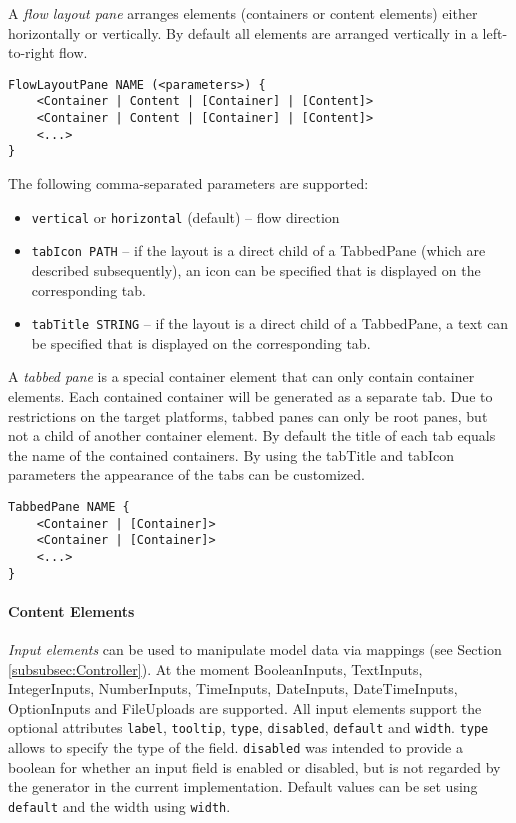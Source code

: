 A \textit{flow layout pane} arranges elements (containers or content elements) either horizontally or vertically. By default all elements are arranged vertically in a left-to-right flow.
\begin{lstlisting}
FlowLayoutPane NAME (<parameters>) {
	<Container | Content | [Container] | [Content]>
	<Container | Content | [Container] | [Content]>
	<...>
}
\end{lstlisting}
The following comma-separated parameters are supported:
\begin{itemize}
\item \lstinline!vertical! or \lstinline!horizontal! (default) -- flow direction
\item \lstinline!tabIcon PATH! -- if the layout is a direct child of a TabbedPane (which are described subsequently), an icon can be specified that is displayed on the corresponding tab.
\item \lstinline!tabTitle STRING! -- if the layout is a direct child of a TabbedPane, a text can be specified that is displayed on the corresponding tab.
\end{itemize}

A \textit{tabbed pane} is a special container element that can only contain container elements. Each contained container will be generated as a separate tab. Due to restrictions on the target platforms, tabbed panes can only be root panes, but not a child of another container element. By default the title of each tab equals the name of the contained containers. By using the tabTitle and tabIcon parameters the appearance of the tabs can be customized.
\begin{lstlisting}
TabbedPane NAME {
	<Container | [Container]>
	<Container | [Container]>
	<...>
}
\end{lstlisting}

\paragraph{Content Elements}
\textit{Input elements} can be used to manipulate model data via mappings (see Section \ref{subsubsec:Controller}). At the moment BooleanInputs, TextInputs, IntegerInputs, NumberInputs, TimeInputs, DateInputs, DateTimeInputs, OptionInputs and FileUploads are supported. All input elements support the optional attributes \lstinline!label!, \lstinline!tooltip!, \lstinline!type!, \lstinline!disabled!, \lstinline!default! and \lstinline!width!. \lstinline!type! allows to specify the type of the field. \lstinline!disabled! was intended to provide a boolean for whether an input field is enabled or disabled, but is not regarded by the generator in the current implementation. Default values can be set using \lstinline!default! and the width using \lstinline!width!.


